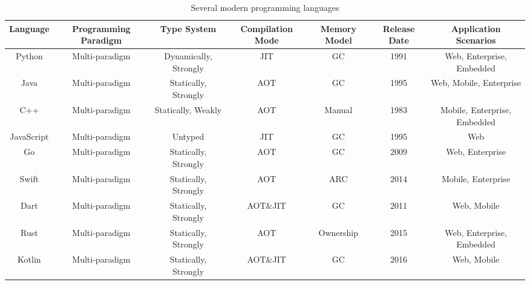\begin{table}[htbp]
    \caption{Several modern programming languages}
    \label{tab:selected-languages}
    \begin{center}
        \begin{tabular}{ccccccc}
            \toprule
            Language & Programming Paradigm & Type System & Compilation Mode & Memory Model &
            Release Date & Application Scenarios \\
            \midrule
            Python & Multi-paradigm & Dynamically, Strongly & JIT & GC & 1991 & Web,
            Enterprise, Embedded \\
            Java & Multi-paradigm & Statically, Strongly & AOT & GC & 1995 & Web,
            Mobile, Enterprise \\
            C++ & Multi-paradigm & Statically, Weakly & AOT & Manual & 1983 & Mobile,
            Enterprise, Embedded \\
            JavaScript & Multi-paradigm & Untyped & JIT & GC & 1995 &
            Web \\
            Go & Multi-paradigm & Statically, Strongly & AOT & GC & 2009 & Web,
            Enterprise \\
            Swift & Multi-paradigm & Statically, Strongly & AOT & ARC & 2014 &
            Mobile, Enterprise \\
            Dart & Multi-paradigm & Statically, Strongly & AOT\&JIT & GC & 2011 &
            Web, Mobile \\
            Rust & Multi-paradigm & Statically, Strongly & AOT & Ownership & 2015 &
            Web, Enterprise, Embedded \\
            Kotlin & Multi-paradigm & Statically, Strongly & AOT\&JIT & GC & 2016 &
            Web, Mobile \\
            \bottomrule
        \end{tabular}
    \end{center}
\end{table}




